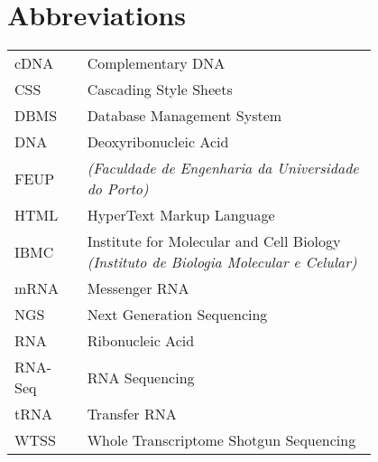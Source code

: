 \chapter*{Abbreviations}

\begin{flushleft}
\begin{tabular}{l p{0.8\linewidth}}
cDNA      & Complementary DNA\\
CSS       & Cascading Style Sheets\\
DBMS      & Database Management System\\
DNA       & Deoxyribonucleic Acid\\
FEUP      & \Feup{} \textit{(Faculdade de Engenharia da Universidade do Porto)}\\
HTML      & HyperText Markup Language\\
IBMC      & Institute for Molecular and Cell Biology \textit{(Instituto de Biologia Molecular e Celular)}\\
mRNA      & Messenger RNA\\
NGS       & Next Generation Sequencing\\
RNA       & Ribonucleic Acid\\
RNA-Seq   & RNA Sequencing\\
tRNA      & Transfer RNA\\
WTSS      & Whole Transcriptome Shotgun Sequencing\\
\end{tabular}
\end{flushleft}


